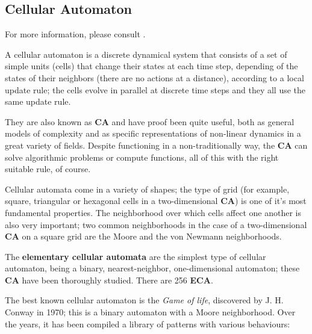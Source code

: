 
\subsection{Cellular Automaton}
\label{sec:brief_summary:cellular_automaton}

For more information, please consult \cite{cellular-automata-sep,
cellular-automata-kari, cellular-automata-math, j1, j2, j3}.

A cellular automaton is a discrete dynamical system that consists of a set of
simple units (cells) that change their states at each time step, depending of
the states of their neighbors (there are no actions at a distance), according to
a local update rule; the cells evolve in parallel at discrete time steps and
they all use the same update rule.

They are also known as \textbf{CA} and have proof been quite useful, both as
general models of complexity and as specific representations of non-linear
dynamics in a great variety of fields. Despite functioning in a
non-traditionally way, the \textbf{CA} can solve algorithmic problems or
compute functions, all of this with the right suitable rule, of course.

Cellular automata come in a variety of shapes; the type of grid (for example,
square,  triangular or hexagonal cells in a two-dimensional \textbf{CA}) is one
of it's most fundamental properties. The neighborhood over which cells affect
one another is also very important; two common neighborhoods in the case of a
two-dimensional \textbf{CA} on a square grid are the Moore and the von Newmann
neighborhoods.

The \textbf{elementary cellular automata} are the simplest type of cellular
automaton, being a binary, nearest-neighbor, one-dimensional automaton; these
\textbf{CA} have been thoroughly studied. There are 256 \textbf{ECA}.

The best known cellular automaton is the \textit{Game of life}, discovered by
J. H. Conway in 1970; this is a binary automaton with a Moore neighborhood. Over
the years, it has been compiled a library of patterns with various behaviours:

